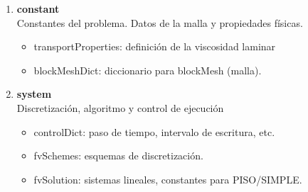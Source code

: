 \begin{frame}
\begin{columns}
\begin{enumerate}
            \item {\bf constant} \\
                  Constantes del problema. Datos de la malla y propiedades f\'isicas.
            \begin{itemize}
                \tiny
                \item transportProperties: definici\'on de la viscosidad laminar
                \item blockMeshDict: diccionario para blockMesh (malla).
            \end{itemize} 
            
            \item {\bf system} \\
                  Discretizaci\'on, algoritmo y control de ejecuci\'on
            \begin{itemize}
                \tiny
                \item controlDict: paso de tiempo, intervalo de escritura, etc.
                \item fvSchemes: esquemas de discretizaci\'on.
                \item fvSolution: sistemas lineales, constantes para PISO/SIMPLE.
            \end{itemize} 
                       
        \end{enumerate}
        
    \end{columns}
    


\end{frame} 








